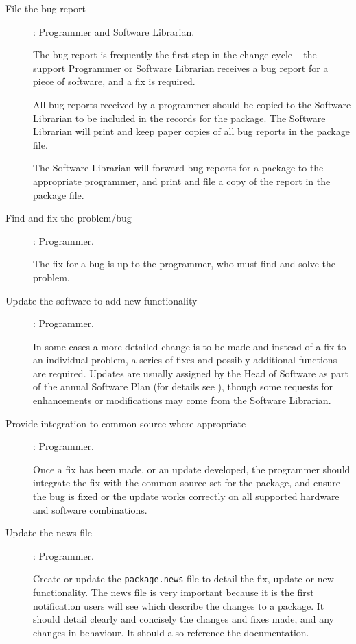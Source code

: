 \begin{description}

\item[File the bug report]: Programmer and Software Librarian.

The bug report is frequently the first step in the change cycle -- the
support Programmer or Software Librarian receives a bug report for a
piece of software, and a fix is required.

All bug reports received by a programmer should be copied to the
Software Librarian to be included in the records for the package.  The
Software Librarian will print and keep paper copies of all bug reports
in the package file.

The Software Librarian will forward bug reports for a package to the
appropriate programmer, and print and file a copy of the report in the
package file.

\item[Find and fix the problem/bug]: Programmer.

The fix for a bug is up to the programmer, who must
find and solve the problem.  

\item[Update the software to add new functionality]: Programmer.

In some cases a more detailed change is to be made and instead of a fix
to an individual problem, a series of fixes and possibly additional functions 
are required.  Updates are usually assigned by the Head
of Software as part of the annual Software Plan (for details see
), though some requests for enhancements or
modifications may come from the Software Librarian.

\item[Provide integration to common source where appropriate]: Programmer.

Once a fix has been made, or an update developed, the programmer should
integrate the fix with the common source set for the package, and ensure
the bug is fixed or the update works correctly on all supported
hardware and software combinations.

\item[Update the news file]: Programmer.

Create or update the {\tt{package.news}} file to detail the fix, update
or new functionality.  The news file is very important because it is the
first notification users will see which describe the changes to a package.
It should detail clearly and concisely the changes and fixes made, and
any changes in behaviour.  It should also reference the documentation.


\end{description}
